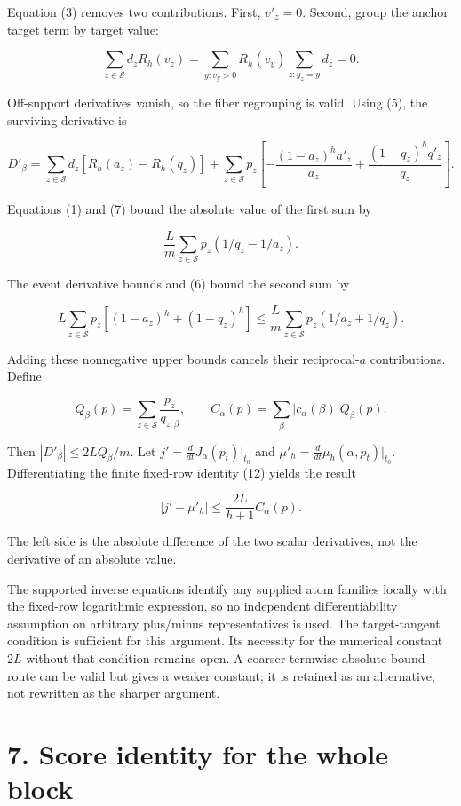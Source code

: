 \documentclass[11pt,a4paper]{article}
\begin{document}
Equation (3) removes two contributions. First, \(v'_z=0\). Second, group the anchor target term by target value:

\[
\sum_{z\in\mathcal S}d_zR_h(v_z)
=\sum_{y:v_y>0}R_h(v_y)\sum_{z:y_z=y}d_z=0.
\]

Off-support derivatives vanish, so the fiber regrouping is valid. Using (5), the surviving derivative is

\[
D'_\beta=\sum_{z\in\mathcal S}d_z[R_h(a_z)-R_h(q_z)]
+\sum_{z\in\mathcal S}p_z
\left[-\frac{(1-a_z)^h a'_z}{a_z}
+\frac{(1-q_z)^h q'_z}{q_z}\right]. \tag{14}
\]

Equations (1) and (7) bound the absolute value of the first sum by

\[
\frac Lm\sum_{z\in\mathcal S}p_z(1/q_z-1/a_z). \tag{15}
\]

The event derivative bounds and (6) bound the second sum by

\[
L\sum_{z\in\mathcal S}p_z[(1-a_z)^h+(1-q_z)^h]
\le\frac Lm\sum_{z\in\mathcal S}p_z(1/a_z+1/q_z). \tag{16}
\]

Adding these nonnegative upper bounds cancels their reciprocal-\(a\) contributions. Define

\[
Q_\beta(p)=\sum_{z\in\mathcal S}\frac{p_z}{q_{z,\beta}},
\qquad C_\alpha(p)=\sum_\beta|c_\alpha(\beta)|Q_\beta(p).
\]

Then \(|D'_\beta|\le2LQ_\beta/m\). Let \(j'=\frac d{dt}J_\alpha(p_t)|_{t_0}\) and \(\mu'_h=\frac d{dt}\mu_h(\alpha,p_t)|_{t_0}\). Differentiating the finite fixed-row identity (12) yields the result

\[
\boxed{|j'-\mu'_h|\le
\frac{2L}{h+1}C_\alpha(p).} \tag{17}
\]

The left side is the absolute difference of the two scalar derivatives, not the derivative of an absolute value.

The supported inverse equations identify any supplied atom families locally with the fixed-row logarithmic expression, so no independent differentiability assumption on arbitrary plus/minus representatives is used. The target-tangent condition is sufficient for this argument. Its necessity for the numerical constant \(2L\) without that condition remains open. A coarser termwise absolute-bound route can be valid but gives a weaker constant; it is retained as an alternative, not rewritten as the sharper argument.

\section{7. Score identity for the whole block}\label{score-identity-for-the-whole-block}
\end{document}
